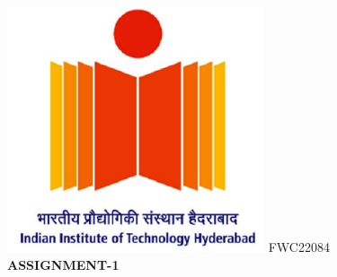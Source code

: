 \documentclass[12pt,a4paper]{report}
\begin{document}
\raggedright{\includegraphics[scale=0.8]{iith.png}} \hspace{12cm}\raggedleft FWC22084\vspace{8mm}\\ 
 \centering \Large \textbf{ASSIGNMENT-1} \normalsize \vspace{15mm}
\end{document}
